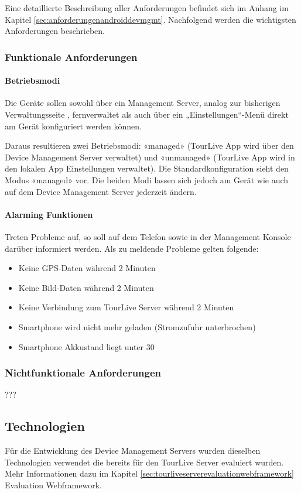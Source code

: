 Eine detaillierte Beschreibung aller Anforderungen befindet sich im Anhang im Kapitel  \ref{sec:anforderungenandroiddevmgmt}. Nachfolgend werden die wichtigsten Anforderungen beschrieben.

\subsubsection{Funktionale Anforderungen}
\paragraph{Betriebsmodi}
Die Geräte sollen sowohl über ein Management Server, analog zur bisherigen Verwaltungsseite , fernverwaltet als auch über ein „Einstellungen“-Menü direkt am Gerät konfiguriert werden können. 

Daraus resultieren zwei Betriebsmodi: «managed» (TourLive App wird über den Device Management Server verwaltet) und «unmanaged» (TourLive App wird in den lokalen App Einstellungen verwaltet). Die Standardkonfiguration sieht den Modus «managed» vor. Die beiden Modi lassen sich jedoch am Gerät wie auch auf dem Device Management Server jederzeit ändern. 


\paragraph{Alarming Funktionen}
Treten Probleme auf, so soll auf dem Telefon sowie in der Management Konsole darüber informiert werden. Als zu meldende Probleme gelten folgende:
\begin{itemize}
\item Keine GPS-Daten während 2 Minuten
\item Keine Bild-Daten während 2 Minuten
\item Keine Verbindung zum TourLive Server während 2 Minuten
\item Smartphone wird nicht mehr geladen (Stromzufuhr unterbrochen)
\item Smartphone Akkustand liegt unter 30%
\end{itemize}
	
\subsubsection{Nichtfunktionale Anforderungen}
??? 
\subsection{Technologien}
Für die Entwicklung des Device Management Servers wurden dieselben Technologien verwendet die bereits für den TourLive Server evaluiert wurden. Mehr Informationen dazu im Kapitel  \ref{sec:tourliveserverevaluationwebframework} Evaluation Webframework.

